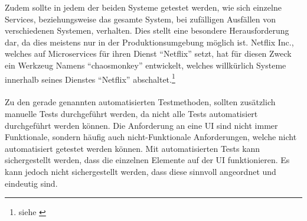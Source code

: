 Zudem sollte in jedem der beiden Systeme getestet werden, wie sich einzelne Services, beziehungsweise das gesamte System, bei zufälligen Ausfällen von verschiedenen Systemen, verhalten. Dies stellt eine besondere Herausforderung dar, da dies meistens nur in der Produktionsumgebung möglich ist. Netflix Inc., welches auf Microservices für ihren Dienst "`Netflix"' setzt, hat für diesen Zweck ein Werkzeug Namens "`chaosmonkey"' entwickelt, welches willkürlich Systeme innerhalb seines Dienstes "`Netflix"' abschaltet.\footnote{siehe \cite{chaosmonkey}}
\\\\
Zu den gerade genannten automatisierten Testmethoden, sollten zusätzlich manuelle Tests durchgeführt werden, da nicht alle Tests automatisiert durchgeführt werden können. Die Anforderung an eine UI sind nicht immer Funktionale, sondern häufig auch nicht-Funktionale Anforderungen, welche nicht automatisiert getestet werden können. Mit automatisierten Tests kann sichergestellt werden, dass die einzelnen Elemente auf der UI funktionieren. Es kann jedoch nicht sichergestellt werden, dass diese sinnvoll angeordnet und eindeutig sind.
